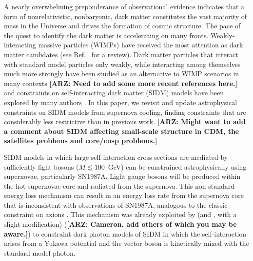 \documentclass[nofootinbib,prd,superscriptaddress,twocolumn]{revtex4}
\newcommand{\arz}[1]{{{\bf{\color{BrickRed}[ARZ: #1]}}}}
\begin{document}
A nearly overwhelming preponderance of observational evidence indicates that a form of nonrelativistic, nonbaryonic, 
dark matter constitutes the vast majority of mass in the Universe and drives the formation of cosmic structure. 
The pace of the quest to identify the dark matter is accelerating on many fronts. Weakly-interacting massive 
particles (WIMPs) have received the most attention as dark matter candidates (see Ref.~\cite{jungman_etal96} for a review). 
Dark matter particles that interact with standard model particles only weakly, while interacting among themselves 
much more strongly have been studied as an alternative to WIMP scenarios in many contexts 
\cite{carlson_etal92,deLaix_etal95,atrio-barandela_davidson97,spergel_steinhardt00,hogan_dalcanton00,mohapatra_teplitz00,
dave_etal01,hisano_etal04,hisano_etal05,pospelov_etal08,arkani-hamed_etal08a,lattanzi_silk08,ackerman_etal09,feng_etal09,
kong_etal15} \arz{Need to add some more recent references here.} 
and constraints on self-interacting dark matter (SIDM) models have been explored by many authors \cite{yoshida_etal00,gnedin_ostriker01,miralda-escude02,randall_etal08,kamionkowski_profumo08,zentner09,robertson_zentner09,pieri_etal09,spolyar_etal09,finkbeiner_etal09,
slatyer_etal09,bramante_etal14,albuquerque_etal14,kaplinghat_etal14,chen_etal14,feng_etal16,catena_widmark16}.
In this paper, we revisit and update astrophysical constraints on SIDM models from 
supernova cooling, finding constraints that are considerably less restrictive than in 
previous work. 
\arz{Might want to add a comment about SIDM affecting small-scale structure in CDM, the satellites problems and core/cusp problems.}


SIDM models in which large self-interaction cross sections are mediated by sufficiently light 
bosons ($M \lesssim 100$~GeV) can be constrained astrophysically using supernovae, particularly 
SN1987A. Light gauge bosons will be produced within the hot supernovae core and 
radiated from the supernova. This non-standard energy loss mechanism can result in an energy loss rate 
from the supernova core that is inconsistent with observations of SN1987A, analogous to the 
classic constraint on axions \cite{raffelt96_book}. This mechanism was already exploited by 
\cite{dent_etal12} (and \cite{rrapaj_reddy16}, with a slight modification) (\arz{Cameron, add others of which you may be aware.}) 
to constraint dark photon models of SIDM in which the self-interaction arises from a Yukawa potential and the 
vector boson is kinetically mixed with the standard model photon.
\end{document}
